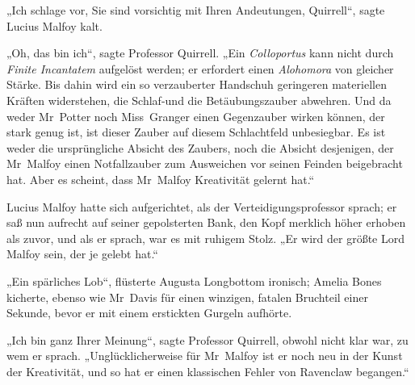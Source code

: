 „Ich schlage vor, Sie sind vorsichtig mit Ihren Andeutungen, Quirrell“, sagte Lucius Malfoy kalt.

„Oh, das bin ich“, sagte Professor Quirrell. „Ein \emph{Colloportus} kann nicht durch \emph{Finite Incantatem} aufgelöst werden; er erfordert einen \emph{Alohomora} von gleicher Stärke. Bis dahin wird ein so verzauberter Handschuh geringeren materiellen Kräften widerstehen, die Schlaf-und die Betäubungszauber abwehren. Und da weder Mr~Potter noch Miss~Granger einen Gegenzauber wirken können, der stark genug ist, ist dieser Zauber auf diesem Schlachtfeld unbesiegbar. Es ist weder die ursprüngliche Absicht des Zaubers, noch die Absicht desjenigen, der Mr~Malfoy einen Notfallzauber zum Ausweichen vor seinen Feinden beigebracht hat. Aber es scheint, dass Mr~Malfoy Kreativität gelernt hat.“

Lucius Malfoy hatte sich aufgerichtet, als der Verteidigungsprofessor sprach; er saß nun aufrecht auf seiner gepolsterten Bank, den Kopf merklich höher erhoben als zuvor, und als er sprach, war es mit ruhigem Stolz. „Er wird der größte Lord Malfoy sein, der je gelebt hat.“

„Ein spärliches Lob“, flüsterte Augusta Longbottom ironisch; Amelia Bones kicherte, ebenso wie Mr~Davis für einen winzigen, fatalen Bruchteil einer Sekunde, bevor er mit einem erstickten Gurgeln aufhörte.

„Ich bin ganz Ihrer Meinung“, sagte Professor Quirrell, obwohl nicht klar war, zu wem er sprach. „Unglücklicherweise für Mr~Malfoy ist er noch neu in der Kunst der Kreativität, und so hat er einen klassischen Fehler von Ravenclaw begangen.“


